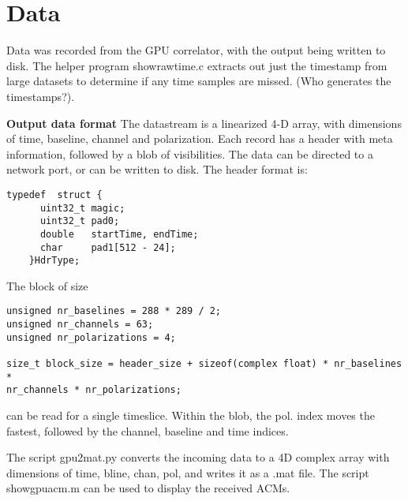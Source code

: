 \documentclass {article}
\begin{document}
\section {Data}
Data was recorded from the GPU correlator, with the output being written to
disk. The helper program showrawtime.c extracts out just the timestamp from
large datasets to determine if any time samples are missed. (Who generates the
timestamps?). 

\textbf{Output data  format} The  datastream is a  linearized 4-D  array, with
dimensions  of time,  baseline, channel  and polarization.  Each record  has a
header with meta  information, followed by a blob of  visibilities. The data
can be directed to a network port, or can be written to disk. The header
format is:
\begin{verbatim}
typedef  struct {
      uint32_t magic;
      uint32_t pad0;
      double   startTime, endTime;
      char     pad1[512 - 24];
    }HdrType;
\end{verbatim}
The block of size
\begin{verbatim}
unsigned nr_baselines = 288 * 289 / 2;
unsigned nr_channels = 63;
unsigned nr_polarizations = 4;

size_t block_size = header_size + sizeof(complex float) * nr_baselines *
nr_channels * nr_polarizations;
\end{verbatim}
can be read for a single timeslice. Within the blob, the pol. index moves the
fastest, followed by the channel, baseline and time indices.

The script gpu2mat.py converts the incoming data to a 4D complex array with dimensions
of time, bline, chan, pol, and writes it as a .mat file. The script
showgpuacm.m can be used to display the received ACMs.


\begin{figure*}[tbh]
\end{figure*}

\begin{figure*}[tbh]
\end{figure*}
\end{document}

